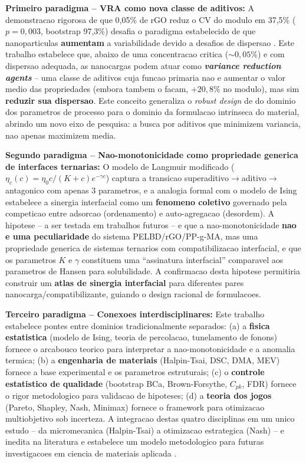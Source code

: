 \documentclass[11pt,a4paper,oneside]{article}
\begin{document}
{\bfseries Primeiro paradigma -- VRA como nova classe de aditivos:} A demonstracao rigorosa de que 0,05\% de rGO reduz o CV do modulo em 37,5\% ($p{=}0{,}003$, bootstrap 97,3\%) desafia o paradigma estabelecido de que nanoparticulas {\bfseries aumentam} a variabilidade devido a desafios de dispersao \cite{Potts2011, Kim2010}. Este trabalho estabelece que, abaixo de uma concentracao critica (${\sim}0{,}05\%$) e com dispersao adequada, as nanocargas podem atuar como {\bfseries \textit{variance reduction agents}} -- uma classe de aditivos cuja funcao primaria nao e aumentar o valor medio das propriedades (embora tambem o facam, $+20{,}8\%$ no modulo), mas sim {\bfseries reduzir sua dispersao}. Este conceito generaliza o \textit{robust design} de \citet{Taguchi1986} do dominio dos parametros de processo para o dominio da formulacao intrinseca do material, abrindo um novo eixo de pesquisa: a busca por aditivos que minimizem variancia, nao apenas maximizem media.

{\bfseries Segundo paradigma -- Nao-monotonicidade como propriedade generica de interfaces ternarias:} O modelo de Langmuir modificado ($\eta_c(c){=}\eta_0 c/(K{+}c)e^{-\gamma c}$) captura a transicao superaditivo$\rightarrow$aditivo$\rightarrow$antagonico com apenas 3 parametros, e a analogia formal com o modelo de Ising \cite{Ising1925} estabelece a sinergia interfacial como um {\bfseries fenomeno coletivo} governado pela competicao entre adsorcao (ordenamento) e auto-agregacao (desordem). A hipotese -- a ser testada em trabalhos futuros -- e que a nao-monotonicidade {\bfseries nao e uma peculiaridade} do sistema PELBD/rGO/PP-g-MA, mas uma propriedade generica de sistemas ternarios com compatibilizacao interfacial, e que os parametros $K$ e $\gamma$ constituem uma ``assinatura interfacial'' comparavel aos parametros de Hansen para solubilidade. A confirmacao desta hipotese permitiria construir um {\bfseries atlas de sinergia interfacial} para diferentes pares nanocarga/compatibilizante, guiando o design racional de formulacoes.

{\bfseries Terceiro paradigma -- Conexoes interdisciplinares:} Este trabalho estabelece pontes entre dominios tradicionalmente separados: (a) a {\bfseries fisica estatistica} (modelo de Ising, teoria de percolacao, tunelamento de fonons) fornece o arcabouco teorico para interpretar a nao-monotonicidade e a anomalia termica; (b) a {\bfseries engenharia de materiais} (Halpin-Tsai, DSC, DMA, MEV) fornece a base experimental e os parametros estruturais; (c) o {\bfseries controle estatistico de qualidade} (bootstrap BCa, Brown-Forsythe, $C_{pk}$, FDR) fornece o rigor metodologico para validacao de hipoteses; (d) a {\bfseries teoria dos jogos} (Pareto, Shapley, Nash, Minimax) fornece o framework para otimizacao multiobjetivo sob incerteza. A integracao destas quatro disciplinas em um unico estudo -- da micromecanica (Halpin-Tsai) a otimizacao estrategica (Nash) -- e inedita na literatura e estabelece um modelo metodologico para futuras investigacoes em ciencia de materiais aplicada \cite{Montgomery2020, Myerson1991}.
\end{document}
